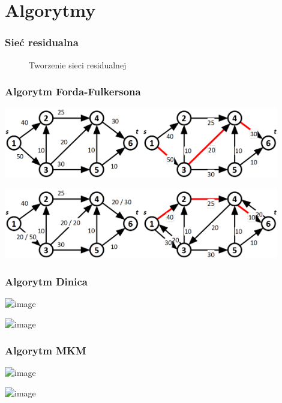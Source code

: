 \documentclass{beamer}
\begin{document}
\section{Algorytmy}
\begin{frame}\frametitle{Sieć residualna}
	\begin{figure}
		\quad
		\caption{Tworzenie sieci residualnej}
	\end{figure}
\end{frame}
\begin{frame}\frametitle{Algorytm Forda-Fulkersona}
	\begin{center}
		\includegraphics[width=0.9\textwidth]{./img/pres_ff1_1}\\\par\bigskip
		\includegraphics[width=0.9\textwidth]{./img/pres_ff2_1}
	\end{center}
\end{frame}
\begin{frame}\frametitle{Algorytm Dinica}
	\begin{center}
		\includegraphics<1>[width=0.9\textwidth]{./img/pres_dinic1}\\\par\bigskip
		\includegraphics<1>[width=0.9\textwidth]{./img/pres_dinic2}
	\end{center}
\end{frame}
\begin{frame}\frametitle{Algorytm MKM}
	\begin{center}
		\includegraphics<1>[width=0.9\textwidth]{./img/pres_mkm1}\\\par\bigskip
		\includegraphics<1>[width=0.9\textwidth]{./img/pres_mkm2}
	\end{center}
\end{frame}
\end{document}
